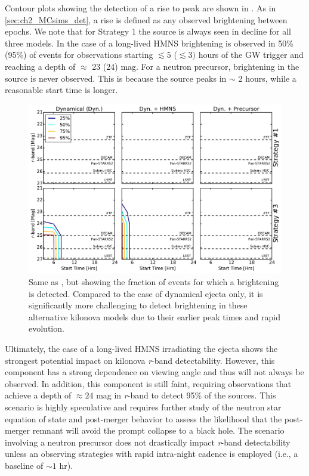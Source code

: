 Contour plots showing the detection of a rise to peak are shown in . As in \cref{sec:ch2_MCsims_det}, a rise is defined as any observed brightening between epochs. We note that for Strategy 1 the source is always seen in decline for all three models. In the case of a long-lived HMNS brightening is observed in 50\% (95\%) of events for observations starting $\lesssim5$ ($\lesssim 3)$ hours of the GW trigger and reaching a depth of $\approx$ 23 (24) mag. For a neutron precursor, brightening in the source is never observed. This is because the source peaks in $\sim$ 2 hours, while a reasonable start time is longer.
 
 \begin{figure}[t!]
\centering
\includegraphics[width=\textwidth]{./figs/chapter2/f22.pdf}
\caption{\singlespace Same as , but showing the fraction of events for which a brightening is detected. Compared to the case of dynamical ejecta only, it is significantly more challenging to detect brightening in these alternative kilonova models due to their earlier peak times and rapid evolution.}
\label{fig:ch2_altrise}
\end{figure}

Ultimately, the case of a long-lived HMNS irradiating the ejecta shows the strongest potential impact on kilonova {\em r}-band detectability. However, this component has a strong dependence on viewing angle and thus will not always be observed. In addition, this component is still faint, requiring observations that achieve a depth of $\approx24$ mag in {\em r}-band to detect 95\% of the sources. This scenario is highly speculative and requires further study of the neutron star equation of state and post-merger behavior to assess the likelihood that the post-merger remnant will avoid the prompt collapse to a black hole. The scenario involving a neutron precursor does not drastically impact {\em r}-band detectability unless an observing strategies with rapid intra-night cadence is employed (i.e., a baseline of $\sim1$ hr).

